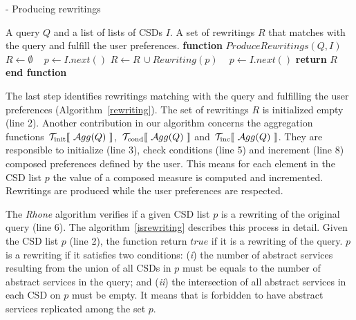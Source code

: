 \begin{algorithm}
\small
\caption{ - Producing rewritings}
\label{rewriting}
\begin{algorithmic}[1]
\REQUIRE A query $Q$ and a list of lists of CSDs $I$.
\ENSURE A set of rewritings $R$ that matches with the query and fulfill the user preferences.
\STATE \textbf{function} $\mathit{ProduceRewritings} (Q, I)$
	\STATE $R\leftarrow \emptyset$
	\STATE ~\! 
    \STATE $p \leftarrow I.next()$
			\STATE $R\leftarrow R\,\cup \mathit{Rewriting}(p)$
			\STATE ~\!
		\ENDIF
		\STATE $p \leftarrow I.\mathit{next}()$
	\ENDWHILE
    \STATE \textbf{return} $R$
\STATE \textbf{end function}
\end{algorithmic}
\end{algorithm}

%
The last step identifies rewritings matching with the query and fulfilling the user preferences (Algorithm~\ref{rewriting}). The set of rewritings $R$ is initialized empty (line 2).
%
%
Another contribution in our algorithm concerns the aggregation functions $~\!\hbox{${\cal T}_{\mathrm{init}} [\![\ {\cal A}{gg}(Q)\ ]\!]$}$, $~\!\hbox{${\cal T}_{\mathrm{cond}} [\![\ {\cal A}{gg}(Q)\ ]\!]$}$ and $~\!\hbox{${\cal T}_{\mathrm{inc}} [\![\ {\cal A}{gg}(Q)\ ]\!]$}$.
They are responsible to initialize (line 3), check conditions (line 5) and increment (line 8) composed preferences defined by the user.
This means for each element in the CSD list $p$ the value of a composed measure is computed and incremented. 
Rewritings are produced while the user preferences are respected. 

The \textit{Rhone} algorithm verifies if a given CSD list $p$ is a rewriting
of the original query (line 6).
The algorithm~\ref{isrewriting} describes this process in detail. 
Given the CSD list $p$ (line 2), the function return $true$ if it is a
rewriting of the query.
$p$ is a rewriting if it satisfies two conditions: (\textit{i}) the number of
abstract services resulting from the union of all CSDs in $p$ must be equals to
the number of abstract services in the query; and (\textit{ii}) the intersection
of all abstract services in each CSD on $p$ must be empty.
It means that is forbidden to have abstract services replicated among the set $p$.

